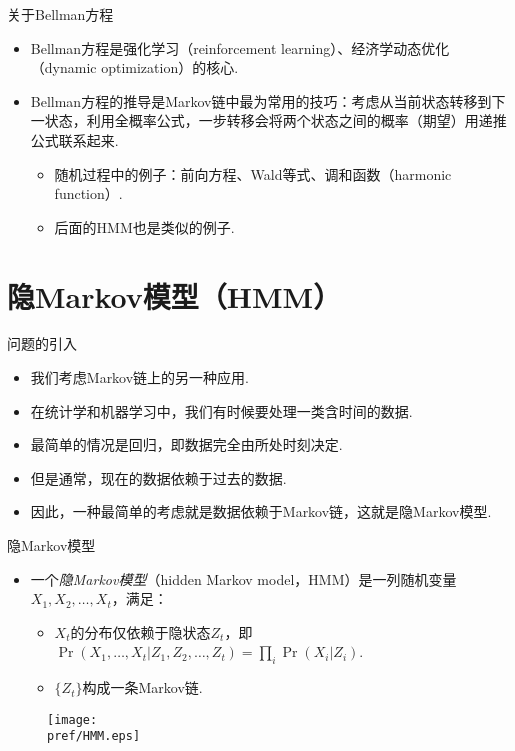 {关于Bellman方程}
\begin{itemize}
    \item Bellman方程是强化学习（reinforcement learning）、经济学动态优化（dynamic optimization）的核心.
    \item Bellman方程的推导是Markov链中最为常用的技巧：考虑从当前状态转移到下一状态，利用全概率公式，一步转移会将两个状态之间的概率（期望）用递推公式联系起来.
    \begin{itemize}
        \item 随机过程中的例子：前向方程、Wald等式、调和函数（harmonic function）.
        \item 后面的HMM也是类似的例子.
    \end{itemize}
\end{itemize}


\section{隐Markov模型（HMM）}

问题的引入

\begin{itemize}
    \item 我们考虑Markov链上的另一种应用.
    \item 在统计学和机器学习中，我们有时候要处理一类含时间的数据.
    \item 最简单的情况是回归，即数据完全由所处时刻决定.
    \item 但是通常，现在的数据依赖于过去的数据.
    \item 因此，一种最简单的考虑就是数据依赖于Markov链，这就是隐Markov模型.
\end{itemize}


{隐Markov模型}
\begin{itemize}
    \item 一个\emph{隐Markov模型}（hidden Markov model，HMM）是一列随机变量$X_1,X_2,\dots, X_t$，满足：
    \begin{itemize}
        \item $X_t$的分布仅依赖于隐状态$Z_t$，即$\Pr(X_1,\dots,X_t|Z_1,Z_2,\dots,Z_t)=\prod_i \Pr(X_i|Z_i)$.
        \item $\{Z_t\}$构成一条Markov链.
    \end{itemize}
\end{itemize}
\begin{figure}
    \centering
    \texttt{[image: \\pref/HMM.eps]}
\end{figure}


